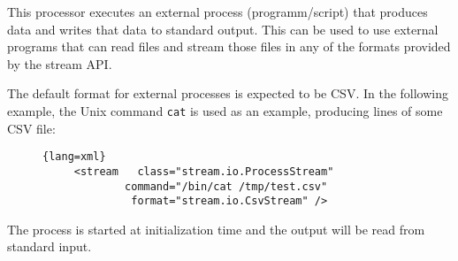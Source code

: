 \newpage
{}
This processor executes an external process (programm/script) that
produces data and writes that data to standard output. This can be used
to use external programs that can read files and stream those files in
any of the formats provided by the stream API.

The default format for external processes is expected to be CSV.
In the following example, the Unix command \texttt{cat} is used as an
example, producing lines of some CSV file:
\begin{figure}[h!]
  \centering
  \begin{lstlisting}{lang=xml}
     <stream   class="stream.io.ProcessStream"
             command="/bin/cat /tmp/test.csv"
              format="stream.io.CsvStream" />
  \end{lstlisting}
\end{figure}

The process is started at initialization time and the output will be
read from standard input.

\begin{table}[h]
\end{table}
\afterpage{\clearpage}
